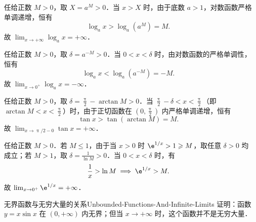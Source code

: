\begin{myproof}

    任给正数 $M > 0$，取 $X = a^M > 0$．当 $x > X$ 时，由于底数 $a > 1$，对数函数严格单调递增，恒有
    \begin{equation}
        \log_a x > \log_a (a^M) = M.
    \end{equation}
    故 $\lim_{x\to +\infty} \log_a x = +\infty$．


    任给正数 $M > 0$，取 $\delta = a^{-M} > 0$．当 $0 < x < \delta$ 时，由对数函数的严格单调性，恒有
    \begin{equation}
        \log_a x < \log_a (a^{-M}) = -M.
    \end{equation}
    故 $\lim_{x\to 0^+} \log_a x = -\infty$．


    任给正数 $M > 0$，取 $\delta = \frac{\uppi}{2} - \arctan M > 0$．当 $\frac{\uppi}{2} - \delta < x < \frac{\uppi}{2}$（即 $\arctan M < x < \frac{\uppi}{2}$）时，由于正切函数在 $\left(0, \frac{\uppi}{2}\right)$ 内严格单调递增，恒有
    \begin{equation}
        \tan x > \tan(\arctan M) = M.
    \end{equation}
    故 $\lim_{x\to \uppi/2-0} \tan x = +\infty$．


    任给正数 $M > 0$．若 $M \leqslant 1$，由于当 $x > 0$ 时 $\e^{1/x} > 1 \geqslant M$，取任意 $\delta > 0$ 均成立；若 $M > 1$，取 $\delta = \frac{1}{\ln M} > 0$．当 $0 < x < \delta$ 时，有
    \begin{equation}
        \frac{1}{x} > \ln M \implies \e^{1/x} > M.
    \end{equation}
    故 $\lim_{x\to 0^+} \e^{1/x} = +\infty$．
\end{myproof}

\begin{problem}{无界函数与无穷大量的关系}{Unbounded-Functions-And-Infinite-Limits}
    证明：函数 $y = x\sin x$ 在 $(0, +\infty)$ 内无界；但当 $x \to +\infty$ 时，这个函数并不是无穷大量．
\end{problem}

